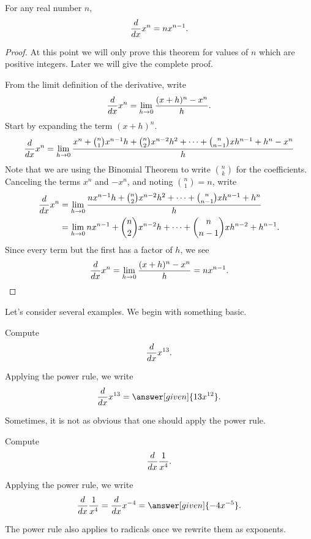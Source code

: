 \documentclass{ximera}
\begin{document}
\begin{theorem}\label{T:powerrule}
For any real number $n$, 
\[
\frac{d}{dx} x^n = n x^{n-1}.
\]

\begin{proof}
At this point we will only prove this theorem for values of $n$ which are positive
integers. Later we will give the complete proof. 

From the limit
definition of the derivative, write
\[
\ddx x^n = \lim_{ h\to0} \frac{(x+ h)^n-x^n}{h}.
\]
Start by expanding the term $(x+h)^n$.
\[
\ddx x^n=\lim_{h\to0} \frac{x^n + \binom{n}{1}x^{n-1} h + \binom{n}{2}x^{n-2} h^2+\cdots+\binom{n}{n-1}x h^{n-1} +  h^n-x^n}{h}
\]
Note that we are using the Binomial Theorem to write $\binom{n}{k}$ for the
coefficients. Canceling the terms $x^n$ and $-x^n$, and noting
$\binom{n}{1}= n$, write
\begin{align*}
\ddx x^n&=\lim_{h\to0} \frac{nx^{n-1} h + \binom{n}{2}x^{n-2} h^2+\cdots+\binom{n}{n-1}x h^{n-1} +  h^n}{h} \\
&=\lim_{h\to0} nx^{n-1} + \binom{n}{2}x^{n-2} h+\cdots+\binom{n}{n-1}x h^{n-2} +  h^{n-1}.
\end{align*}
Since every term but the first has a factor of $h$, we see
\[
\ddx x^n = \lim_{ h\to0}\frac{(x+ h)^n-x^n}{h} = nx^{n-1}.
\]
\end{proof}
\end{theorem}

Let's consider several examples. We begin with something basic.

\begin{example}
Compute
\[
\frac{d}{dx} x^{13}.
\]
\begin{explanation}
Applying the power rule, we write
\[
\ddx x^{13} = \answer[given]{13x^{12}}.
\]
\end{explanation}
\end{example}

Sometimes, it is not as obvious that one should apply the power rule.

\begin{example}
Compute
\[
\frac{d}{dx} \frac{1}{x^4}.
\]
\begin{explanation}
Applying the power rule, we write
\[
\ddx \frac{1}{x^4} = \ddx x^{-4} = \answer[given]{-4x^{-5}}.
\]
\end{explanation}
\end{example}

The power rule also applies to radicals once we rewrite them as exponents.
\end{document}
